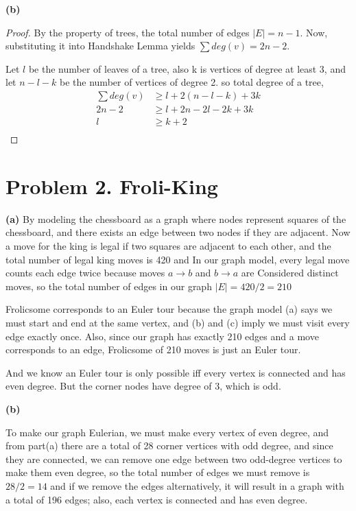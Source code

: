 \documentclass{article}
\begin{document}
\vspace{\baselineskip}
\noindent\textbf{(b)}
\begin{proof}
By the property of trees, the total number of edges $|E| = n - 1$. Now, substituting it into
Handshake Lemma yields $\sum deg(v) = 2n - 2$.

Let $l$ be the number of leaves of a tree, also k is vertices of degree at least 3, and let $n - l - k$ be the number of vertices of degree 2.
so total degree of a tree,
\[
\begin{aligned}
\sum deg(v) &\geq l + 2(n - l - k) + 3k\\
2n - 2 &\geq l + 2n - 2l -2k + 3k\\
l &\geq k + 2\\
\end{aligned}
\]
\end{proof}


\section*{Problem 2. Froli-King}
\textbf{(a)}
By modeling the chessboard as a graph where nodes represent squares of the chessboard, and there exists an edge between two
nodes if they are adjacent.
Now a move for the king is legal if two squares are adjacent to each other, and the total number of legal king moves is 420
and In our graph model, every legal move counts each edge twice because moves $a \rightarrow b$ and $b \rightarrow a$ are
Considered distinct moves, so the total number of edges in our graph $|E| = 420/2 = 210$

Frolicsome corresponds to an Euler tour because the graph model (a) says we must start and end at the same vertex, and (b) and (c)
imply we must visit every edge exactly once. Also, since our graph has exactly 210 edges and a move corresponds to
an edge, Frolicsome of 210 moves is just an Euler tour.

And we know an Euler tour is only possible iff every vertex is connected and has even degree. But the corner nodes have
degree of 3, which is odd.

\vspace{\baselineskip}
\noindent\textbf{(b)}

To make our graph Eulerian, we must make every vertex of even degree, and from part(a) there are a total of 28 corner
vertices with odd degree, and since they are connected, we can remove one edge between two odd-degree vertices
to make them even degree, so the total number of edges we must remove is $28 / 2 = 14$ and
if we remove the edges alternatively, it will result in a graph with a total of
196 edges; also, each vertex is connected and has even degree.
\end{document}
